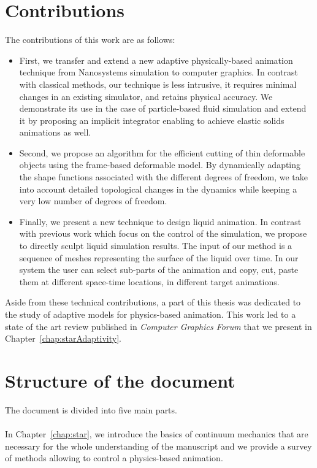 \section{Contributions}
The contributions of this work are as follows:
\begin{itemize}
    \item First, we transfer and extend a new adaptive physically-based animation technique from Nanosystems simulation to computer graphics. In contrast with classical methods, our technique is less intrusive, it requires minimal changes in an existing simulator, and retains physical accuracy. We demonstrate its use in the case of particle-based fluid simulation and extend it by proposing an implicit integrator enabling to achieve elastic solids animations as well.
    \item Second, we propose an algorithm for the efficient cutting of thin deformable objects using the frame-based deformable model. By dynamically adapting the shape functions associated with the different degrees of freedom, we take into account detailed topological changes in the dynamics while keeping a very low number of degrees of freedom.
    \item Finally, we present a new technique to design liquid animation. In contrast with previous work which focus on the control of the simulation, we propose to directly sculpt liquid simulation results. The input of our method is a sequence of meshes representing the surface of the liquid over time. In our system the user can select sub-parts of the animation and copy, cut, paste them at different space-time locations, in different target animations.
\end{itemize}
Aside from these technical contributions, a part of this thesis was dedicated to the study of adaptive models for physics-based animation. 
This work led to a state of the art review published in \emph{Computer Graphics Forum} that we present in Chapter~\ref{chap:starAdaptivity}.

\section{Structure of the document}
The document is divided into five main parts.
\paragraph*{}
In Chapter~\ref{chap:star}, we introduce the basics of continuum mechanics that are necessary for the whole understanding of the manuscript and we provide a survey of methods allowing to control a physics-based animation.

